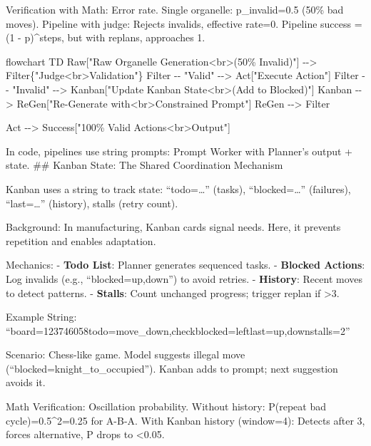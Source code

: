 \documentclass[
]{article}
\newenvironment{Shaded}{}{}
\newcommand{\NormalTok}[1]{#1}
\begin{document}
Verification with Math: Error rate. Single organelle: p\_invalid=0.5
(50\% bad moves). Pipeline with judge: Rejects invalids, effective
rate=0. Pipeline success = (1 - p)\^{}steps, but with replans,
approaches 1.

\begin{Shaded}
\begin{Highlighting}[]
\NormalTok{flowchart TD}
\NormalTok{    Raw["Raw Organelle Generation\textless{}br\textgreater{}(50\% Invalid)"] {-}{-}\textgreater{} Filter\{"Judge\textless{}br\textgreater{}Validation"\}}
\NormalTok{    Filter {-}{-} "Valid" {-}{-}\textgreater{} Act["Execute Action"]}
\NormalTok{    Filter {-}{-} "Invalid" {-}{-}\textgreater{} Kanban["Update Kanban State\textless{}br\textgreater{}(Add to Blocked)"]}
\NormalTok{    Kanban {-}{-}\textgreater{} ReGen["Re{-}Generate with\textless{}br\textgreater{}Constrained Prompt"]}
\NormalTok{    ReGen {-}{-}\textgreater{} Filter}
    
\NormalTok{    Act {-}{-}\textgreater{} Success["100\% Valid Actions\textless{}br\textgreater{}Output"]}
\end{Highlighting}
\end{Shaded}

In code, pipelines use string prompts: Prompt Worker with Planner's
output + state. \#\# Kanban State: The Shared Coordination Mechanism

Kanban uses a string to track state: ``todo=\ldots{}'' (tasks),
``blocked=\ldots{}'' (failures), ``last=\ldots{}'' (history), stalls
(retry count).

Background: In manufacturing, Kanban cards signal needs. Here, it
prevents repetition and enables adaptation.

Mechanics: - \textbf{Todo List}: Planner generates sequenced tasks. -
\textbf{Blocked Actions}: Log invalids (e.g., ``blocked=up,down'') to
avoid retries. - \textbf{History}: Recent moves to detect patterns. -
\textbf{Stalls}: Count unchanged progress; trigger replan if
\textgreater3.

Example String:
``board=123746058\textbar todo=move\_down,check\textbar blocked=left\textbar last=up,down\textbar stalls=2''

Scenario: Chess-like game. Model suggests illegal move
(``blocked=knight\_to\_occupied''). Kanban adds to prompt; next
suggestion avoids it.

Math Verification: Oscillation probability. Without history: P(repeat
bad cycle)=0.5\^{}2=0.25 for A-B-A. With Kanban history (window=4):
Detects after 3, forces alternative, P drops to \textless0.05.
\end{document}
